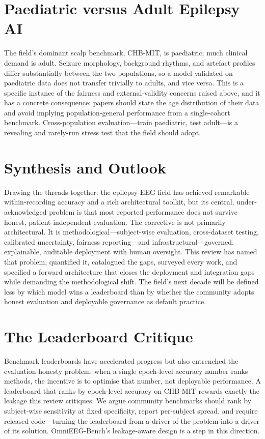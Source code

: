 \section{Paediatric versus Adult Epilepsy AI}
The field's dominant scalp benchmark, CHB-MIT, is paediatric; much clinical demand is adult. Seizure morphology, background rhythms, and artefact profiles differ substantially between the two populations, so a model validated on paediatric data does not transfer trivially to adults, and vice versa. This is a specific instance of the fairness and external-validity concerns raised above, and it has a concrete consequence: papers should state the age distribution of their data and avoid implying population-general performance from a single-cohort benchmark. Cross-population evaluation---train paediatric, test adult---is a revealing and rarely-run stress test that the field should adopt.

\section{Synthesis and Outlook}
Drawing the threads together: the epilepsy-EEG field has achieved remarkable within-recording accuracy and a rich architectural toolkit, but its central, under-acknowledged problem is that most reported performance does not survive honest, patient-independent evaluation. The corrective is not primarily architectural. It is methodological---subject-wise evaluation, cross-dataset testing, calibrated uncertainty, fairness reporting---and infrastructural---governed, explainable, auditable deployment with human oversight. This review has named that problem, quantified it, catalogued the gaps, surveyed every work, and specified a forward architecture that closes the deployment and integration gaps while demanding the methodological shift. The field's next decade will be defined less by which model wins a leaderboard than by whether the community adopts honest evaluation and deployable governance as default practice.

\section{The Leaderboard Critique}
Benchmark leaderboards have accelerated progress but also entrenched the evaluation-honesty problem: when a single epoch-level accuracy number ranks methods, the incentive is to optimise that number, not deployable performance. A leaderboard that ranks by epoch-level accuracy on CHB-MIT rewards exactly the leakage this review critiques. We argue community benchmarks should rank by subject-wise sensitivity at fixed specificity, report per-subject spread, and require released code---turning the leaderboard from a driver of the problem into a driver of its solution. OmniEEG-Bench's leakage-aware design \citep{ep260600815} is a step in this direction.

